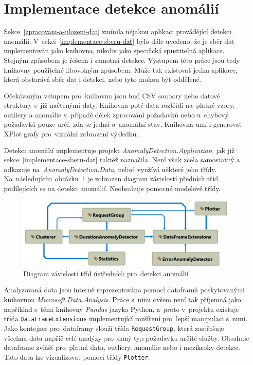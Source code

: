 \section{Implementace detekce anomálií}
\label{implementace-detekce-anomalii}
Sekce~\ref{zpracovani-a-ulozeni-dat} zmínila nějakou aplikaci provádějící detekci anomálií. V~sekci~\ref{implementace-sberu-dat} bylo dále uvedeno, že je sběr dat implementován jako knihovna, nikoliv jako specifická spustitelná aplikace. Stejným způsobem je řešena i samotná detekce. Výstupem této práce jsou tedy knihovny použitelné libovolným způsobem. Může tak existovat jedna aplikace, která obstarává sběr dat i detekci, nebo tyto mohou být oddělené. 

Očekávaným vstupem pro~knihovnu jsou buď CSV soubory nebo datové struktury s~již načtenými daty. Knihovna poté data roztřídí na~platné vzory, outliery a anomálie v~případě délek zpracování požadavků nebo u~chybový požadavků pouze určí, zda se jedná o~anomální stav. Knihovna umí i generovat XPlot grafy pro~vizuální zobrazení výsledků.

Detekci anomálií implementuje projekt \emph{AnomalyDetection.Application}, jak již sekce~\ref{implementace-sberu-dat} taktéž naznačila. Není však zcela samostatný a odkazuje na~\emph{AnomalyDetection.Data}, neboť využívá některé jeho třídy. Na~následujícím obrázku~\ref{diagram-zavislosti-trid} je zobrazen diagram závislostí předních tříd podílejících se na detekci anomálií. Neobsahuje pomocné modelové třídy.

\begin{figure}[hbt]
    \centering
    \includegraphics[width=1\textwidth]{obrazky/anomaly-detection-class-dependency-diagram.png}
    \caption{Diagram závislostí tříd ústředních pro~detekci anomálií}
    \label{diagram-zavislosti-trid}
\end{figure}

Analyzovaná data jsou interně reprezentována pomocí dataframů poskytovanými knihovnou \emph{Microsoft.Data.Analysis}. Práce s~nimi ovšem není tak příjemná jako například s~těmi knihovny \emph{Pandas} jazyka Python, a~proto v~projektu existuje třída \texttt{DataFrameExtensions} implementující rozšíření pro~lepší manipulaci s~nimi. Jako kontejner pro~dataframy slouží třída \texttt{RequestGroup}, která zastřešuje všechna data napříč celé analýzy pro~daný typ požadavku určité služby. Obsahuje dataframe zvlášť pro~platná data, outliery, anomálie nebo i mezikroky detekce. Tato data lze vizualizovat pomocí třídy \texttt{Plotter}.

